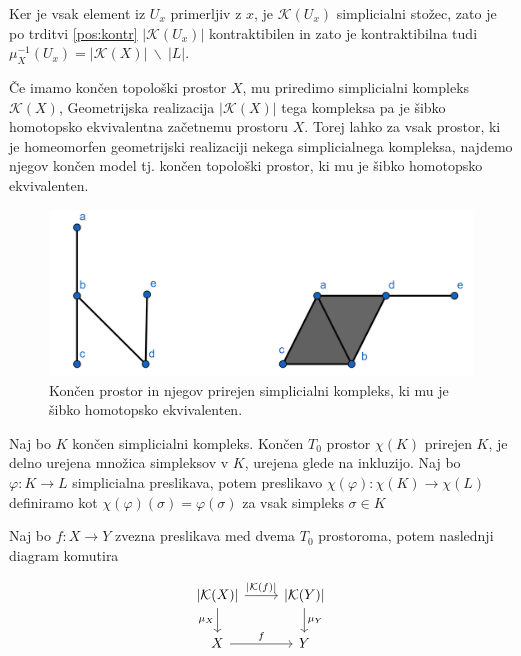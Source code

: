 \documentclass[mat1]{fmfdelo}
\DeclareRobustCommand{\k}{
    \mathcal{K}
}
\begin{document}
\begin{dokaz}
    Ker je vsak element iz $U_x$ primerljiv z $x$, je $\k(U_x)$ 
    simplicialni stožec, zato je po trditvi \ref{pos:kontr} $|\k(U_x)|$ 
    kontraktibilen in zato je kontraktibilna tudi $\mu_X^{-1}
    (U_x)=|\mathcal{K}(X)|\ \backslash \ |L|$.
\end{dokaz}


Če imamo končen topološki prostor $X$, mu priredimo simplicialni kompleks
$\k(X)$, Geometrijska realizacija $|\k(X)|$ tega kompleksa pa je šibko homotopsko ekvivalentna 
začetnemu prostoru $X$. Torej lahko za vsak prostor, ki je homeomorfen geometrijski realizaciji
nekega simplicialnega kompleksa, najdemo njegov končen model tj. končen topološki prostor, ki mu
je šibko homotopsko ekvivalenten.

\begin{figure}[h]
    \centering
    \includegraphics[width=1\linewidth]{simp.png}
    \caption{Končen prostor in njegov prirejen simplicialni kompleks, ki mu je šibko homotopsko ekvivalenten.}
\end{figure}


\begin{definicija}
    Naj bo $K$ končen simplicialni kompleks. Končen $T_0$
    prostor $\chi(K)$ prirejen $K$, je delno urejena množica simpleksov v $K$, urejena glede na inkluzijo.
    Naj bo $\varphi:K\rightarrow L$ simplicialna preslikava, potem preslikavo  $\chi(\varphi):\chi(K)\rightarrow \chi(L)$ definiramo kot 
    $\chi(\varphi)(\sigma)=\varphi(\sigma)$ za vsak simpleks $\sigma \in K$
\end{definicija}


\begin{lema}
    \label{lem:komutira}
    Naj bo $f :X\rightarrow Y$ zvezna preslikava med dvema $T_0$ prostoroma, potem naslednji diagram komutira

    \[\begin{tikzcd}
        {|\k(X)|}\arrow{r}{|\k(f)|} \arrow[swap]{d}{\mu_X} & {|\k(Y)|} \arrow{d}{\mu_Y} \\
       X \arrow{r}{f} & Y
       \end{tikzcd}
       \]
    
\end{lema}
\end{document}
